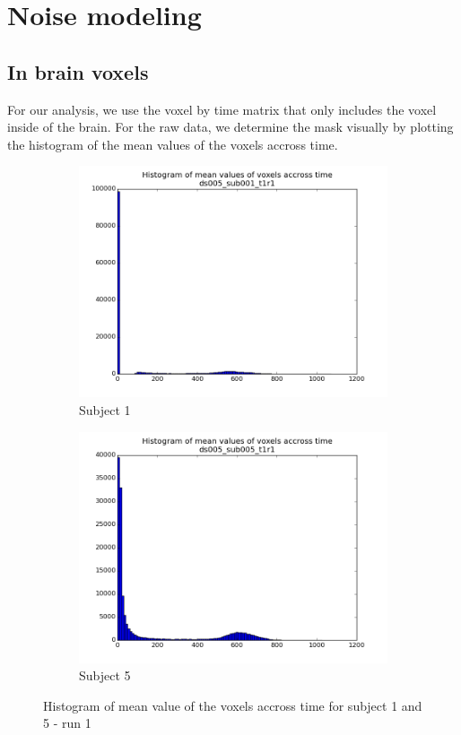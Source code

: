 \section{Noise modeling}
\subsection{In brain voxels}

For our analysis, we use the voxel by time matrix that only includes the voxel 
inside of the brain. For the raw data, we determine the mask visually by plotting
the histogram of the mean values of the voxels accross time.

\begin{figure}[H]
\begin{subfigure}{.5\textwidth}
  \centering
  \includegraphics[width=.9\linewidth]{../fig/histograms/ds005_sub001_t1r1_hist.png}
  \caption{Subject 1}
  \label{fig:hista}
\end{subfigure}%
\begin{subfigure}{.5\textwidth}
  \centering
  \includegraphics[width=.9\linewidth]{../fig/histograms/ds005_sub005_t1r1_hist.png}
  \caption{Subject 5}
  \label{fig:histb}
\end{subfigure}
\caption{Histogram of mean value of the voxels accross time for subject 1 and 5 - run 1}
\label{fig:fig}
\end{figure}

